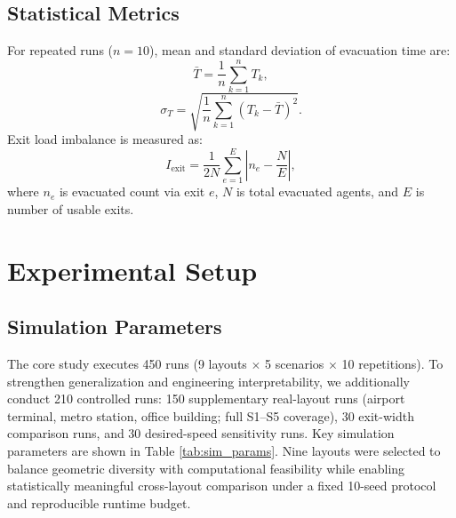 \documentclass[journal]{IEEEtran}
\begin{document}
\subsection{Statistical Metrics}
For repeated runs ($n=10$), mean and standard deviation of evacuation time are:
\begin{equation}
    \bar{T}=\frac{1}{n}\sum_{k=1}^{n}T_k,
\end{equation}
\begin{equation}
    \sigma_T=\sqrt{\frac{1}{n}\sum_{k=1}^{n}(T_k-\bar{T})^2}.
\end{equation}
Exit load imbalance is measured as:
\begin{equation}
    I_{\mathrm{exit}}=\frac{1}{2N}\sum_{e=1}^{E}\left|n_e-\frac{N}{E}\right|,
\end{equation}
where $n_e$ is evacuated count via exit $e$, $N$ is total evacuated agents, and $E$ is number of usable exits.

\section{Experimental Setup}
\subsection{Simulation Parameters}
The core study executes 450 runs (9 layouts $\times$ 5 scenarios $\times$ 10 repetitions). To strengthen generalization and engineering interpretability, we additionally conduct 210 controlled runs: 150 supplementary real-layout runs (airport terminal, metro station, office building; full S1--S5 coverage), 30 exit-width comparison runs, and 30 desired-speed sensitivity runs. Key simulation parameters are shown in Table \ref{tab:sim_params}.
Nine layouts were selected to balance geometric diversity with computational feasibility while enabling statistically meaningful cross-layout comparison under a fixed 10-seed protocol and reproducible runtime budget.
\end{document}
